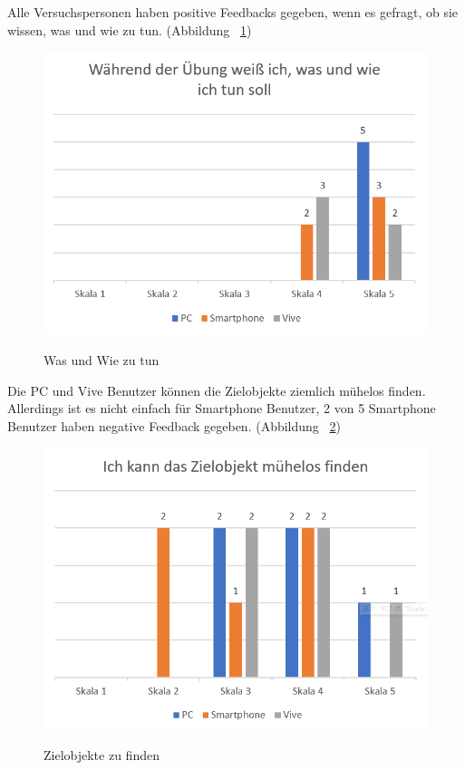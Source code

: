 Alle Versuchspersonen haben positive Feedbacks gegeben, wenn es gefragt, ob sie wissen, was und wie zu tun. (Abbildung ~\ref{fig:wasWie})

\begin{figure}[ht]
\vspace*{1em}
\centering
\caption{Was und Wie zu tun}
\includegraphics[width= \textwidth]{images/wasWie.png}
\label{fig:wasWie} 
\end{figure}

Die PC und Vive Benutzer können die Zielobjekte ziemlich mühelos finden. Allerdings ist es nicht einfach für Smartphone Benutzer, 2 von 5 Smartphone Benutzer haben negative Feedback gegeben. (Abbildung ~\ref{fig:muehelosFinden})

\begin{figure}[ht]
\vspace*{1em}
\centering
\caption{Zielobjekte zu finden}
\includegraphics[width= \textwidth]{images/mueelosFinden.png}
\label{fig:muehelosFinden} 
\end{figure}

